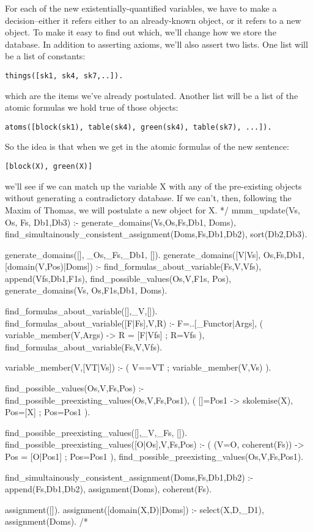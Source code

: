 \documentclass{book}[9pt]
\newenvironment{code}%
{\small \verbatim}%
{\endverbatim \large}
\begin{document}
For each of the new existentially-quantified variables, we have to make a
decision--either it refers either to an already-known object, or it refers to
a new object.  To make it easy to find out which, we'll change how we store
the database.  In addition to asserting axioms, we'll also assert two lists.
One list will be a list of constants:
\begin{verbatim}
things([sk1, sk4, sk7,..]).
\end{verbatim} 
\noindent which are the items we've already postulated.  Another list will be
a list of the atomic formulas we hold true of those objects:
\begin{verbatim}
atoms([block(sk1), table(sk4), green(sk4), table(sk7), ...]).
\end{verbatim}
\noindent So the idea is that when we get in the atomic formulas of the new
sentence:
\begin{verbatim}
[block(X), green(X)]
\end{verbatim}
\noindent we'll see if we can match up the variable X with any of the
pre-existing objects without generating a contradictory database.  If
we can't, then, following the Maxim of Thomas, we will postulate a new
object for X.
\begin{code}
*/
mmm_update(Vs, Os, Fs, Db1,Db3) :-
        generate_domains(Vs,Os,Fs,Db1, Doms),
        find_simultainously_consistent_assignment(Doms,Fs,Db1,Db2),
        sort(Db2,Db3).

generate_domains([], _Os,_Fs,_Db1, []).
generate_domains([V|Vs], Os,Fs,Db1, [domain(V,Pos)|Doms]) :-
     find_formulas_about_variable(Fs,V,Vfs),
     append(Vfs,Db1,F1s),
     find_possible_values(Os,V,F1s, Pos),
     generate_domains(Vs, Os,F1s,Db1, Doms).

find_formulas_about_variable([],_V,[]).
find_formulas_about_variable([F|Fs],V,R) :-
     F=..[_Functor|Args],
     ( variable_member(V,Args) ->
          R = [F|Vfs]
     ;
          R=Vfs
     ),
     find_formulas_about_variable(Fs,V,Vfs).

variable_member(V,[VT|Vs]) :-
    ( 
        V==VT
    ; 
        variable_member(V,Vs)
    ).


find_possible_values(Os,V,Fs,Pos) :-
    find_possible_preexisting_values(Os,V,Fs,Pos1),
    ( []=Pos1 ->
        skolemise(X),
        Pos=[X]
    ;
        Pos=Pos1
    ).


find_possible_preexisting_values([],_V,_Fs, []).
find_possible_preexisting_values([O|Os],V,Fs,Pos) :-
    ( \+ \+ (V=O, coherent(Fs)) ->
          Pos = [O|Pos1]
    ; 
          Pos=Pos1
    ),
    find_possible_preexisting_values(Os,V,Fs,Pos1).
 
    
find_simultainously_consistent_assignment(Doms,Fs,Db1,Db2) :-
     append(Fs,Db1,Db2),
     assignment(Doms),
     coherent(Fs).
     
assignment([]).
assignment([domain(X,D)|Doms]) :-
    select(X,D,_D1),
    assignment(Doms).
/*
\end{code}
\end{document}
